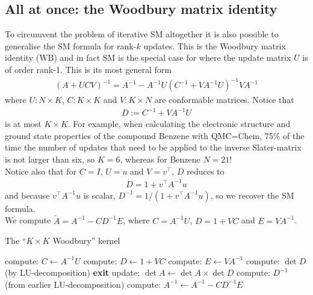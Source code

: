\documentclass[11pt]{article}
\numberwithin{figure}{section}
\numberwithin{table}{section}
\begin{document}
			\subsection{All at once: the Woodbury matrix identity}
			
			To circumvent the problem of iterative SM altogether it is also possible to generalise the SM formula for rank-$k$ updates. This is the Woodbury matrix identity (WB) and in fact SM is the special case for where the update matrix $U$ is of order rank-1. This is its most general form
			\begin{align}
				\left(A+UCV\right)^{-1} = A^{-1} - A^{-1}U(C^{-1}+VA^{-1}U)^{-1}VA^{-1}
			\end{align}
			where $U:N\times K$, $C:K\times K$ and $V:K\times N$ are conformable matrices. Notice that
			\begin{align}\label{eqn:wb-denom}
				D:=C^{-1}+VA^{-1}U
			\end{align}  is at most $K\times K$. For example, when calculating the electronic structure and ground state properties of the compound Benzene with QMC=Chem, 75\% of the time the number of updates that need to be applied to the inverse Slater-matrix is not larger than six, so $K=6$, whereas for Benzene $N=21$!\\
			
			Notice also that for $C=I$, $U=u$ and $V=v^\top$, $D$ reduces to
			\begin{align}
				D = 1 + v^\top A^{-1} u
			\end{align}
			and because $v^\top A^{-1} u$ is scalar,  $D^{-1}=1/\left(1 + v^\top A^{-1} u\right)$, so we recover the SM formula.\\

				We compute $\widetilde{A}=A^{-1}-CD^{-1}E$, where $C=A^{-1}U$, $D=1+VC$ and $E=VA^{-1}$.
			
				\begin{algorithm}[H]
				\caption{The ``$K\times K$ Woodbury'' kernel}\label{algo:woodbury}
 					compute: $C \gets A^{-1} U$\;
 					compute: $D \gets 1 + V C$\;
 					compute: $E \gets V A^{-1}$\;
 					compute: $\det D$ (by LU-decomposition)\;
					{
						\textbf{exit}\;
					}
					update: $\det A \gets \det A\times\det D$\;
					compute: $D^{-1}$ (from earlier LU-decomposition)\;
					compute: $A^{-1} \gets A^{-1}-CD^{-1}E$\;
				\end{algorithm}
		
\end{document}
